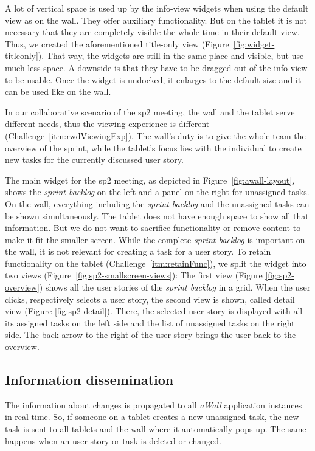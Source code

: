 \documentclass{sigchi}
\begin{document}
A lot of vertical space is used up by the info-view widgets when using the default view as on the wall.
They offer auxiliary functionality. But on the tablet it is not necessary that they are completely visible the whole time in their default view.
Thus, we created the aforementioned title-only view (Figure~\ref{fig:widget-titleonly}).
That way, the widgets are still in the same place and visible, but use much less space.
A downside is that they have to be dragged out of the info-view to be usable.
Once the widget is undocked, it enlarges to the default size and it can be used like on the wall.
	
In our collaborative scenario of the \gls{sp2} meeting, the wall and the tablet serve different needs, thus the viewing experience is different (Challenge~\ref{itm:rwdViewingExp}).
The wall's duty is to give the whole team the overview of the sprint, while the tablet's focus lies with the individual to create new tasks for the currently discussed user story.

The main widget for the \gls{sp2} meeting, as depicted in Figure~\ref{fig:awall-layout}, shows the \textit{sprint backlog} on the left and a panel on the right for unassigned tasks.
On the wall, everything including the \textit{sprint backlog} and the unassigned tasks can be shown simultaneously.
The tablet does not have enough space to show all that information.
But we do not want to sacrifice functionality or remove content to make it fit the smaller screen.
While the complete \textit{sprint backlog} is important on the wall, it is not relevant for creating a task for a user story.
To retain functionality on the tablet (Challenge~\ref{itm:retainFunc}), we split the widget into two views (Figure~\ref{fig:sp2-smallscreen-views}):
The first view (Figure \ref{fig:sp2-overview}) shows all the user stories of the \textit{sprint backlog} in a grid.
When the user clicks, respectively selects a user story, the second view is shown, called detail view (Figure \ref{fig:sp2-detail}).
There, the selected user story is displayed with all its assigned tasks on the left side and the list of unassigned tasks on the right side.
The back-arrow to the right of the user story brings the user back to the overview.

\subsection{Information dissemination}
The information about changes is propagated to all \textit{aWall} application instances in real-time.
So, if someone on a tablet creates a new unassigned task, the new task is sent to all tablets and the wall where it automatically pops up.
The same happens when an user story or task is deleted or changed.
\end{document}
